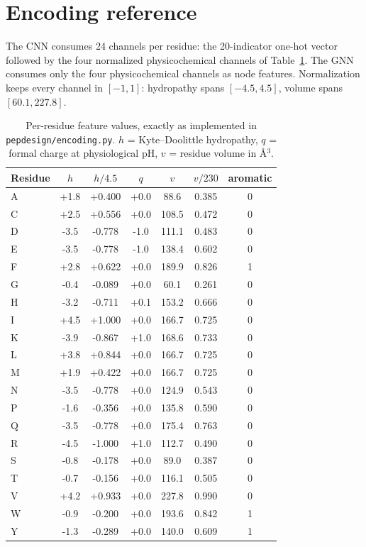 
\section{Encoding reference}\label{app:encoding}
The CNN consumes 24 channels per residue: the 20-indicator one-hot vector
followed by the four normalized physicochemical channels of
Table~\ref{tab:encoding}. The GNN consumes only the four physicochemical
channels as node features. Normalization keeps every channel in
$[-1, 1]$: hydropathy spans $[-4.5, 4.5]$, volume spans $[60.1, 227.8]$.

\begin{table}[h]\centering\small
\caption{Per-residue feature values, exactly as implemented in
\texttt{pepdesign/encoding.py}. $h$ = Kyte--Doolittle hydropathy,
$q$ = formal charge at physiological pH, $v$ = residue volume in \AA$^3$.}
\label{tab:encoding}
\begin{tabular}{lcccccc}
\hline
Residue & $h$ & $h/4.5$ & $q$ & $v$ & $v/230$ & aromatic \\
\hline
A & +1.8 & +0.400 & +0.0 & 88.6 & 0.385 & 0 \\
C & +2.5 & +0.556 & +0.0 & 108.5 & 0.472 & 0 \\
D & -3.5 & -0.778 & -1.0 & 111.1 & 0.483 & 0 \\
E & -3.5 & -0.778 & -1.0 & 138.4 & 0.602 & 0 \\
F & +2.8 & +0.622 & +0.0 & 189.9 & 0.826 & 1 \\
G & -0.4 & -0.089 & +0.0 & 60.1 & 0.261 & 0 \\
H & -3.2 & -0.711 & +0.1 & 153.2 & 0.666 & 0 \\
I & +4.5 & +1.000 & +0.0 & 166.7 & 0.725 & 0 \\
K & -3.9 & -0.867 & +1.0 & 168.6 & 0.733 & 0 \\
L & +3.8 & +0.844 & +0.0 & 166.7 & 0.725 & 0 \\
M & +1.9 & +0.422 & +0.0 & 166.7 & 0.725 & 0 \\
N & -3.5 & -0.778 & +0.0 & 124.9 & 0.543 & 0 \\
P & -1.6 & -0.356 & +0.0 & 135.8 & 0.590 & 0 \\
Q & -3.5 & -0.778 & +0.0 & 175.4 & 0.763 & 0 \\
R & -4.5 & -1.000 & +1.0 & 112.7 & 0.490 & 0 \\
S & -0.8 & -0.178 & +0.0 & 89.0 & 0.387 & 0 \\
T & -0.7 & -0.156 & +0.0 & 116.1 & 0.505 & 0 \\
V & +4.2 & +0.933 & +0.0 & 227.8 & 0.990 & 0 \\
W & -0.9 & -0.200 & +0.0 & 193.6 & 0.842 & 1 \\
Y & -1.3 & -0.289 & +0.0 & 140.0 & 0.609 & 1 \\
\hline
\end{tabular}
\end{table}

